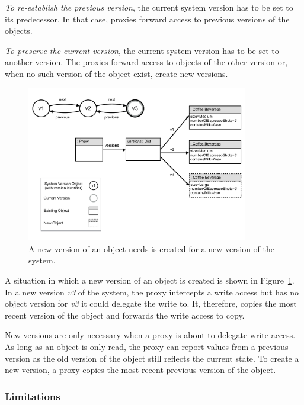 \emph{To re-establish the previous version}, the current system version has to be set to its predecessor.
In that case, proxies forward access to previous versions of the objects.

\emph{To preserve the current version}, the current system version has to be set to another version.
The proxies forward access to objects of the other version or, when no such version of the object exist, create new versions.

\begin{figure}[h]
    \centering
    \includegraphics[width=0.86\textwidth]{figures/4_approach/10_newVersionOfAnObject.pdf}
    \caption{A new version of an object needs is created for a new version of the system.}
    \label{fig:NewVersion}
\end{figure}

A situation in which a new version of an object is created is shown in Figure~\ref{fig:NewVersion}.
In a new version \emph{v3} of the system, the proxy intercepts a write access but has no object version for \emph{v3} it could delegate the write to.
It, therefore, copies the most recent version of the object and forwards the write access to copy.

New versions are only necessary when a proxy is about to delegate write access.
As long as an object is only read, the proxy can report values from a previous version as the old version of the object still reflects the current state.
To create a new version, a proxy copies the most recent previous version of the object.


\subsubsection{Limitations}

